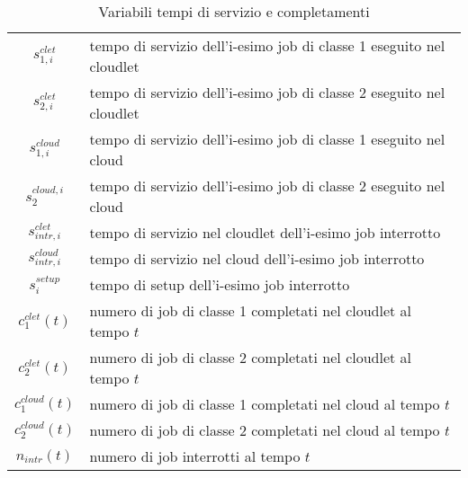 \begin{table}[!h]
\begin{tabular}{c|l}
{$s_{1,i}^{clet}$}       & tempo di servizio dell’i-esimo job di classe 1 eseguito
nel cloudlet \\[2pt]
{$s_{2,i}^{clet}$}       & tempo di servizio dell’i-esimo job di classe 2 eseguito
nel cloudlet \\[2pt]
{$s_{1,i}^{cloud}$}      & tempo di servizio dell’i-esimo job di classe 1 eseguito
nel cloud \\[2pt]
{$s_2^{cloud,i}$}      & tempo di servizio dell’i-esimo job di classe 2 eseguito
nel cloud \\[2pt]
{$s_{intr,i}^{clet}$}  & tempo di servizio nel cloudlet dell’i-esimo job
interrotto \\[2pt]
{$s_{intr,i}^{cloud}$} & tempo di servizio nel cloud dell’i-esimo job interrotto
\\[2pt]
{$s_i^{setup}$}        & tempo di setup dell’i-esimo job interrotto \\[2pt]
{$c_1^{clet}(t)$}      & numero di job di classe 1 completati nel cloudlet al
tempo $t$ \\[2pt]
{$c_2^{clet}(t)$}      & numero di job di classe 2 completati nel cloudlet al
tempo $t$ \\[2pt] 
{$c_1^{cloud}(t)$}     & numero di job di classe 1 completati nel cloud al tempo
$t$ \\[2pt] 
{$c_2^{cloud}(t)$}     & numero di job di classe 2 completati nel cloud al tempo
$t$ \\[2pt]
{$n_{intr}(t)$}        & numero di job interrotti al tempo $t$ \\
\end{tabular}
\centering
\caption{Variabili tempi di servizio e completamenti}
\label{vars}
\end{table}
%
%
